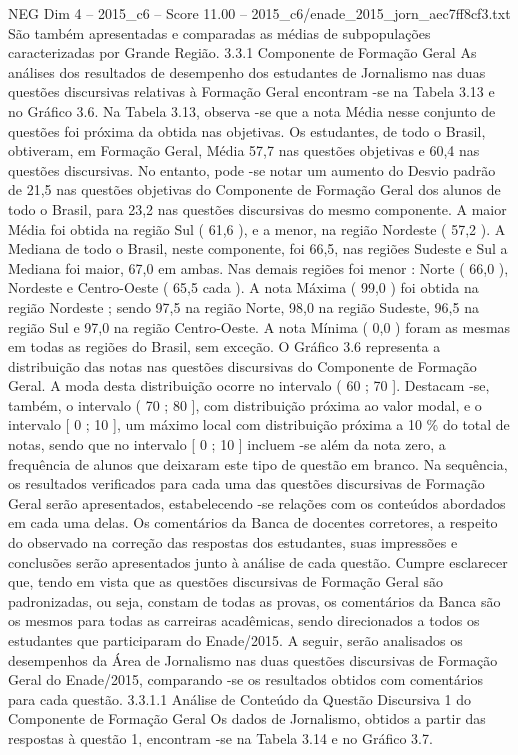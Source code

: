 \begin{textsample}{NEG Dim 4 – 2015\_c6 – Score 11.00 – 2015\_c6/enade\_2015\_jorn\_aec7ff8cf3.txt}
São também apresentadas e comparadas as médias de subpopulações caracterizadas por Grande Região. 3.3.1 Componente de Formação Geral As análises dos resultados de desempenho dos estudantes de Jornalismo nas duas questões discursivas relativas à Formação Geral encontram -se na Tabela 3.13 e no Gráfico 3.6.
Na Tabela 3.13, observa -se que a nota Média nesse conjunto de questões foi próxima da obtida nas objetivas.
Os estudantes, de todo o Brasil, obtiveram, em Formação Geral, Média 57,7 nas questões objetivas e 60,4 nas questões discursivas.
No entanto, pode -se notar um aumento do Desvio padrão de 21,5 nas questões objetivas do Componente de Formação Geral dos alunos de todo o Brasil, para 23,2 nas questões discursivas do mesmo componente.
A maior Média foi obtida na região Sul ( 61,6 ), e a menor, na região Nordeste ( 57,2 ).
A Mediana de todo o Brasil, neste componente, foi 66,5, nas regiões Sudeste e Sul a Mediana foi maior, 67,0 em ambas.
Nas demais regiões foi menor : Norte ( 66,0 ), Nordeste e Centro-Oeste ( 65,5 cada ).
A nota Máxima ( 99,0 ) foi obtida na região Nordeste ; sendo 97,5 na região Norte, 98,0 na região Sudeste, 96,5 na região Sul e 97,0 na região Centro-Oeste.
A nota Mínima ( 0,0 ) foram as mesmas em todas as regiões do Brasil, sem exceção.
O Gráfico 3.6 representa a distribuição das notas nas questões discursivas do Componente de Formação Geral.
A moda desta distribuição ocorre no intervalo ( 60 ; 70 ].
Destacam -se, também, o intervalo ( 70 ; 80 ], com distribuição próxima ao valor modal, e o intervalo [ 0 ; 10 ], um máximo local com distribuição próxima a 10 \% do total de notas, sendo que no intervalo [ 0 ; 10 ] incluem -se além da nota zero, a frequência de alunos que deixaram este tipo de questão em branco.
Na sequência, os resultados verificados para cada uma das questões discursivas de Formação Geral serão apresentados, estabelecendo -se relações com os conteúdos abordados em cada uma delas.
Os comentários da Banca de docentes corretores, a respeito do observado na correção das respostas dos estudantes, suas impressões e conclusões serão apresentados junto à análise de cada questão.
Cumpre esclarecer que, tendo em vista que as questões discursivas de Formação Geral são padronizadas, ou seja, constam de todas as provas, os comentários da Banca são os mesmos para todas as carreiras acadêmicas, sendo direcionados a todos os estudantes que participaram do Enade/2015.
A seguir, serão analisados os desempenhos da Área de Jornalismo nas duas questões discursivas de Formação Geral do Enade/2015, comparando -se os resultados obtidos com comentários para cada questão. 3.3.1.1 Análise de Conteúdo da Questão Discursiva 1 do Componente de Formação Geral Os dados de Jornalismo, obtidos a partir das respostas à questão 1, encontram -se na Tabela 3.14 e no Gráfico 3.7.

\end{textsample}
